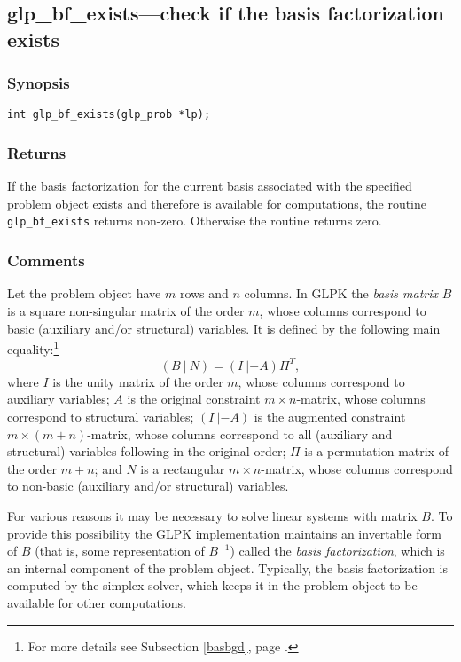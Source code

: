 \subsection{glp\_bf\_exists---check if the basis factorization exists}

\subsubsection*{Synopsis}

\begin{verbatim}
int glp_bf_exists(glp_prob *lp);
\end{verbatim}

\subsubsection*{Returns}

If the basis factorization for the current basis associated with the
specified problem object exists and therefore is available for
computations, the routine \verb|glp_bf_exists| returns non-zero.
Otherwise the routine returns zero.

\subsubsection*{Comments}

Let the problem object have $m$ rows and $n$ columns. In GLPK the
{\it basis matrix} $B$ is a square non-singular matrix of the order $m$,
whose columns correspond to basic (auxiliary and/or structural)
variables. It is defined by the following main
equality:\footnote{For more details see Subsection \ref{basbgd},
page \pageref{basbgd}.}
$$(B\ |\ N)=(I\ |-\!A)\Pi^T,$$
where $I$ is the unity matrix of the order $m$, whose columns correspond
to auxiliary variables; $A$ is the original constraint
$m\times n$-matrix, whose columns correspond to structural variables;
$(I\ |-\!A)$ is the augmented constraint\linebreak
$m\times(m+n)$-matrix, whose columns correspond to all (auxiliary and
structural) variables following in the original order; $\Pi$ is a
permutation matrix of the order $m+n$; and $N$ is a rectangular
$m\times n$-matrix, whose columns correspond to non-basic (auxiliary
and/or structural) variables.

For various reasons it may be necessary to solve linear systems with
matrix $B$. To provide this possibility the GLPK implementation
maintains an invertable form of $B$ (that is, some representation of
$B^{-1}$) called the {\it basis factorization}, which is an internal
component of the problem object. Typically, the basis factorization is
computed by the simplex solver, which keeps it in the problem object
to be available for other computations.

